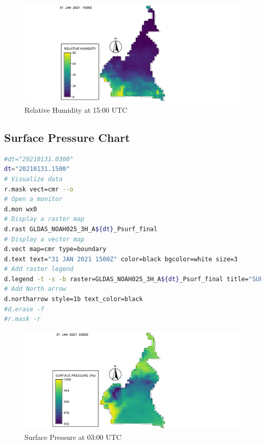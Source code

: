 \begin{figure}[H]
\begin{center}
\includegraphics[scale=0.6]{rh15.png} %
\end{center}
\caption{Relative Humidity at 15:00 UTC}
\label{Relative Humidity at 15:00 UTC}%
\end{figure}

\subsection{Surface Pressure Chart}
\begin{lstlisting}[language=Bash]
#dt="20210131.0300"
dt="20210131.1500"
# Visualize data
r.mask vect=cmr --o
# Open a monitor
d.mon wx0
# Display a raster map
d.rast GLDAS_NOAH025_3H_A${dt}_Psurf_final 
# Display a vector map
d.vect map=cmr type=boundary
d.text text="31 JAN 2021 1500Z" color=black bgcolor=white size=3
# Add raster legend
d.legend -t -s -b raster=GLDAS_NOAH025_3H_A${dt}_Psurf_final title="SURFACE PRESSURE (Pa)" title_fontsize=20 font=sans fontsize=18
# Add North arrow
d.northarrow style=1b text_color=black
#d.erase -f
#r.mask -r
\end{lstlisting}

\begin{figure}[H]
\begin{center}
\includegraphics[scale=0.6]{sp03.png} %
\end{center}
\caption{Surface Pressure at 03:00 UTC}
\label{Surface Pressure  at 03:00 UTC}%
\end{figure}

